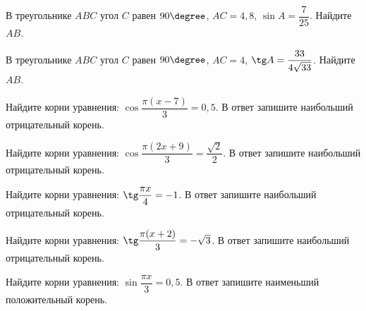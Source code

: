 \begin{class}[number=1]
\begin{listofex}
		
		
		
		\item В треугольнике \(ABC\) угол \(C\) равен \(90\degree\), \(AC=4,8\), \( \sin A = \dfrac{ 7 }{ 25 } \). Найдите \(AB\).
		\item В треугольнике \(ABC\) угол \(C\) равен \(90\degree\), \(AC=4\), \( \tg A = \dfrac{ 33 }{ 4\sqrt{33} } \). Найдите \(AB\). 
		\item Найдите корни уравнения: \( \cos \dfrac{ \pi(x-7) }{ 3 } = 0,5 \).  В ответ запишите наибольший отрицательный корень.
		\item Найдите корни уравнения: \( \cos \dfrac{ \pi(2x+9) }{ 3 } = \dfrac{ \sqrt{2} }{ 2 } \).  В ответ запишите наибольший отрицательный корень.
		\item Найдите корни уравнения: \( \tg \dfrac{ \pi x }{ 4 } = -1 \).  В ответ запишите наибольший отрицательный корень.
		\item Найдите корни уравнения: \( \tg \dfrac{ \pi (x+2) }{ 3 } = -\sqrt{3} \).  В ответ запишите наибольший отрицательный корень.
		\item Найдите корни уравнения: \( \sin \dfrac{ \pi x }{ 3 } = 0,5 \).  В ответ запишите наименьший положительный корень.
		

\end{listofex}
\end{class}
